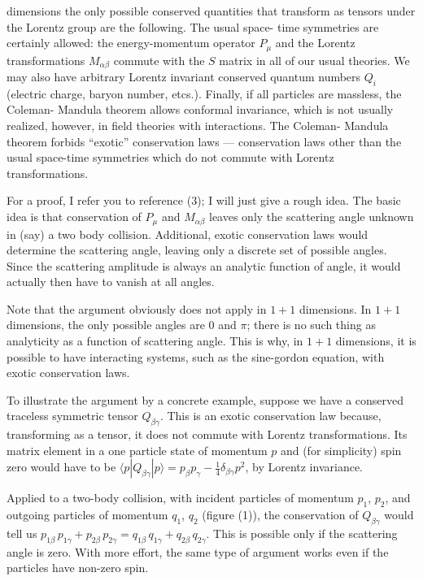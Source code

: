 
dimensions the only possible conserved quantities that transform as
tensors under the Lorentz group are the following. The usual space-
time symmetries are certainly allowed: the energy-momentum operator
$P_\mu$ and the Lorentz transformations $M_{\alpha\beta}$ commute with the
$S$ matrix in all of our usual theories. We may also have arbitrary Lorentz
invariant conserved quantum numbers $Q_i$ (electric charge, baryon
number, etcs.). Finally, if all particles are massless, the Coleman-
Mandula theorem allows conformal invariance, which is not usually
realized, however, in field theories with interactions. The Coleman-
Mandula theorem forbids ``exotic'' conservation laws --- conservation
laws other than the usual space-time symmetries which do not commute
with Lorentz transformations.

For a proof, I refer you to reference (3); I will just give a
rough idea. The basic idea is that conservation of $P_\mu$ and $M_{\alpha\beta}$
leaves only the scattering angle unknown in (say) a two body
collision. Additional, exotic conservation laws would determine the
scattering angle, leaving only a discrete set of possible angles.
Since the scattering amplitude is always an analytic function of
angle, it would actually then have to vanish at all angles.

Note that the argument obviously does not apply in $1+1$
dimensions. In $1+1$ dimensions, the only possible angles are $0$ and $\pi$;
there is no such thing as analyticity as a function of scattering
angle. This is why, in $1+1$ dimensions, it is possible to have
interacting systems, such as the sine-gordon equation, with exotic
conservation laws.

To illustrate the argument by a concrete example, suppose we
have a conserved traceless symmetric tensor $Q_{\beta\gamma}$. This is an exotic
conservation law because, transforming as a tensor, it does not
commute with Lorentz transformations. Its matrix element in a one
particle state of momentum $p$ and (for simplicity) spin zero would
have to be $\langle p| Q_{\beta\gamma} |p\rangle = p_\beta p_\gamma - \frac{1}{4}\delta_{\beta\gamma} p^2$, by Lorentz invariance.

Applied to a two-body collision, with incident particles of momentum
$p_1$, $p_2$, and outgoing particles of momentum $q_1$, $q_2$ (figure (1)), the
conservation of $Q_{\beta\gamma}$ would tell us $p_{1\beta}\, p_{1\gamma} + p_{2\beta}\, p_{2\gamma} = q_{1\beta}\, q_{1\gamma} +
q_{2\beta}\, q_{2\gamma}$. This is possible only if the scattering angle is zero.\begingroup\renewcommand{\thefootnote}{\fnsymbol{footnote}}\footnotemark[1]\endgroup
With more effort, the same type of argument works even if the
particles have non-zero spin.

